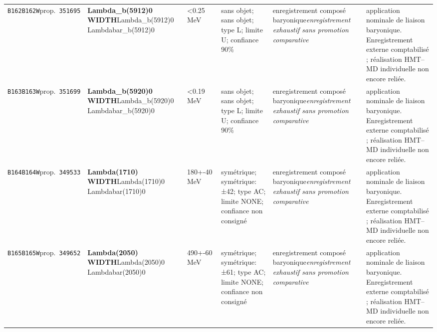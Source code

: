 \begin{landscape}
\begin{longtable}{L{1.85cm}L{4.45cm}L{2.35cm}L{4.05cm}L{3.35cm}L{7.15cm}}
\texttt{B162}\newline \texttt{B162W}\newline prop.\ \texttt{351695} & \textbf{Lambda\_\allowbreak{}b(5912)0 WIDTH}\newline Lambda\_\allowbreak{}b(5912)0 \textbar{}\allowbreak{} Lambdabar\_\allowbreak{}b(5912)0 & \textless{}0.25\,MeV & sans objet; sans objet; type L; limite U; confiance 90\% & enregistrement composé baryonique\newline \emph{enregistrement exhaustif sans promotion comparative} & application nominale de liaison baryonique. Enregistrement externe comptabilisé ; réalisation HMT--MD individuelle non encore reliée. \\
\texttt{B163}\newline \texttt{B163W}\newline prop.\ \texttt{351699} & \textbf{Lambda\_\allowbreak{}b(5920)0 WIDTH}\newline Lambda\_\allowbreak{}b(5920)0 \textbar{}\allowbreak{} Lambdabar\_\allowbreak{}b(5920)0 & \textless{}0.19\,MeV & sans objet; sans objet; type L; limite U; confiance 90\% & enregistrement composé baryonique\newline \emph{enregistrement exhaustif sans promotion comparative} & application nominale de liaison baryonique. Enregistrement externe comptabilisé ; réalisation HMT--MD individuelle non encore reliée. \\
\texttt{B164}\newline \texttt{B164W}\newline prop.\ \texttt{349533} & \textbf{Lambda(1710) WIDTH}\newline Lambda(1710)0 \textbar{}\allowbreak{} Lambdabar(1710)0 & 180+-40\,MeV & symétrique; symétrique: ±42; type AC; limite NONE; confiance non consigné & enregistrement composé baryonique\newline \emph{enregistrement exhaustif sans promotion comparative} & application nominale de liaison baryonique. Enregistrement externe comptabilisé ; réalisation HMT--MD individuelle non encore reliée. \\
\texttt{B165}\newline \texttt{B165W}\newline prop.\ \texttt{349652} & \textbf{Lambda(2050) WIDTH}\newline Lambda(2050)0 \textbar{}\allowbreak{} Lambdabar(2050)0 & 490+-60\,MeV & symétrique; symétrique: ±61; type AC; limite NONE; confiance non consigné & enregistrement composé baryonique\newline \emph{enregistrement exhaustif sans promotion comparative} & application nominale de liaison baryonique. Enregistrement externe comptabilisé ; réalisation HMT--MD individuelle non encore reliée. \\

\end{longtable}
\end{landscape}
